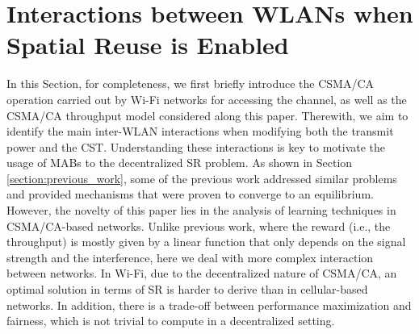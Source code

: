 \documentclass[preprint,12pt]{elsarticle}
\begin{document}
\section{Interactions between WLANs when Spatial Reuse is Enabled}
\label{section:interactions_wlans}    
In this Section, for completeness, we first briefly introduce the CSMA/CA operation carried out by Wi-Fi networks for accessing the channel, as well as the CSMA/CA throughput model considered along this paper. Therewith, we aim to identify the main inter-WLAN interactions when modifying both the transmit power and the CST. Understanding these interactions is key to motivate the usage of MABs to the decentralized SR problem. As shown in Section \ref{section:previous_work}, some of the previous work addressed similar problems and provided mechanisms that were proven to converge to an equilibrium. However, the novelty of this paper lies in the analysis of learning techniques in CSMA/CA-based networks. Unlike previous work, where the reward (i.e., the throughput) is mostly given by a linear function that only depends on the signal strength and the interference, here we deal with more complex interaction between networks. In Wi-Fi, due to the decentralized nature of CSMA/CA, an optimal solution in terms of SR is harder to derive than in cellular-based networks. In addition, there is a trade-off between performance maximization and fairness, which is not trivial to compute in a decentralized setting.
	
\end{document}
